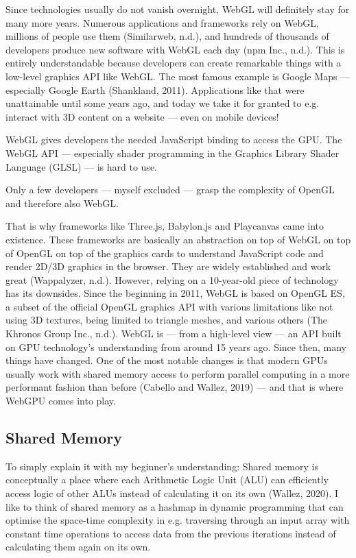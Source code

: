 \documentclass[10pt]{article}
\begin{document}
\begin{sloppypar}
  Since technologies usually do not vanish overnight, WebGL will definitely stay for many more years. Numerous applications and frameworks rely on WebGL, millions of people use them (Similarweb, n.d.), and hundreds of thousands of developers produce new software with WebGL each day (npm Inc., n.d.). This is entirely understandable because developers can create remarkable things with a low-level graphics API like WebGL. The most famous example is Google Maps — especially Google Earth (Shankland, 2011). Applications like that were unattainable until some years ago, and today we take it for granted to e.g. interact with 3D content on a website — even on mobile devices!

  WebGL gives developers the needed JavaScript binding to access the GPU. The WebGL API — especially shader programming in the Graphics Library Shader Language (GLSL) — is hard to use.

  Only a few developers — myself excluded — grasp the complexity of OpenGL and therefore also WebGL.

  That is why frameworks like Three.js, Babylon.js and Playcanvas came into existence. These frameworks are basically an abstraction on top of WebGL on top of OpenGL on top of the graphics cards to understand JavaScript code and render 2D/3D graphics in the browser. They are widely established and work great (Wappalyzer, n.d.). However, relying on a 10-year-old piece of technology has its downsides. Since the beginning in 2011, WebGL is based on OpenGL ES, a subset of the official OpenGL graphics API with various limitations like not using 3D textures, being limited to triangle meshes, and various others (The Khronos Group Inc., n.d.). WebGL is — from a high-level view — an API built on GPU technology’s understanding from around 15 years ago. Since then, many things have changed. One of the most notable changes is that modern GPUs usually work with shared memory access to perform parallel computing in a more performant fashion than before (Cabello and Wallez, 2019) — and that is where WebGPU comes into play.

  \subsection{Shared Memory}
  \label{subsec:shared-memory}

  To simply explain it with my beginner’s understanding: Shared memory is conceptually a place where each Arithmetic Logic Unit (ALU) can efficiently access logic of other ALUs instead of calculating it on its own (Wallez, 2020). I like to think of shared memory as a hashmap in dynamic programming that can optimise the space-time complexity in e.g. traversing through an input array with constant time operations to access data from the previous iterations instead of calculating them again on its own.


\end{sloppypar}
\end{document}
